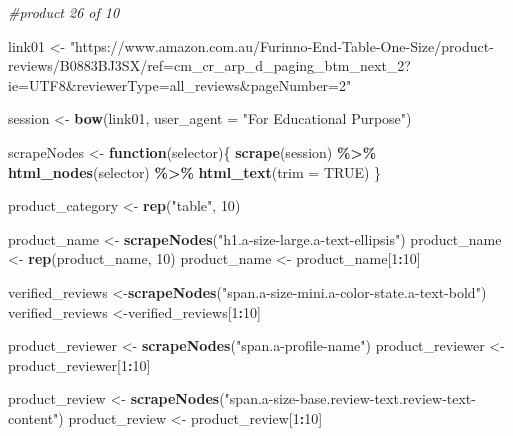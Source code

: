 \documentclass[
]{article}
\newenvironment{Shaded}{\begin{snugshade}}{\end{snugshade}}
\newcommand{\AttributeTok}[1]{\textcolor[rgb]{0.13,0.29,0.53}{#1}}
\newcommand{\CommentTok}[1]{\textcolor[rgb]{0.56,0.35,0.01}{\textit{#1}}}
\newcommand{\ConstantTok}[1]{\textcolor[rgb]{0.56,0.35,0.01}{#1}}
\newcommand{\ControlFlowTok}[1]{\textcolor[rgb]{0.13,0.29,0.53}{\textbf{#1}}}
\newcommand{\DecValTok}[1]{\textcolor[rgb]{0.00,0.00,0.81}{#1}}
\newcommand{\FunctionTok}[1]{\textcolor[rgb]{0.13,0.29,0.53}{\textbf{#1}}}
\newcommand{\NormalTok}[1]{#1}
\newcommand{\OtherTok}[1]{\textcolor[rgb]{0.56,0.35,0.01}{#1}}
\newcommand{\SpecialCharTok}[1]{\textcolor[rgb]{0.81,0.36,0.00}{\textbf{#1}}}
\newcommand{\StringTok}[1]{\textcolor[rgb]{0.31,0.60,0.02}{#1}}
\begin{document}
\begin{Shaded}
\begin{Highlighting}[]
\CommentTok{\#product 26 of 10}

\NormalTok{link01 }\OtherTok{\textless{}{-}} \StringTok{"https://www.amazon.com.au/Furinno{-}End{-}Table{-}One{-}Size/product{-}reviews/B0883BJ3SX/ref=cm\_cr\_arp\_d\_paging\_btm\_next\_2?ie=UTF8\&reviewerType=all\_reviews\&pageNumber=2"}


\NormalTok{  session }\OtherTok{\textless{}{-}} \FunctionTok{bow}\NormalTok{(link01,}
               \AttributeTok{user\_agent =} \StringTok{"For Educational Purpose"}\NormalTok{)}

\NormalTok{  scrapeNodes }\OtherTok{\textless{}{-}} \ControlFlowTok{function}\NormalTok{(selector)\{}
    \FunctionTok{scrape}\NormalTok{(session) }\SpecialCharTok{\%\textgreater{}\%}
      \FunctionTok{html\_nodes}\NormalTok{(selector) }\SpecialCharTok{\%\textgreater{}\%}
      \FunctionTok{html\_text}\NormalTok{(}\AttributeTok{trim =} \ConstantTok{TRUE}\NormalTok{)}
\NormalTok{  \}}

\NormalTok{  product\_category }\OtherTok{\textless{}{-}} \FunctionTok{rep}\NormalTok{(}\StringTok{"table"}\NormalTok{, }\DecValTok{10}\NormalTok{)}

\NormalTok{  product\_name }\OtherTok{\textless{}{-}} \FunctionTok{scrapeNodes}\NormalTok{(}\StringTok{"h1.a{-}size{-}large.a{-}text{-}ellipsis"}\NormalTok{)}
\NormalTok{  product\_name }\OtherTok{\textless{}{-}} \FunctionTok{rep}\NormalTok{(product\_name, }\DecValTok{10}\NormalTok{)}
\NormalTok{  product\_name }\OtherTok{\textless{}{-}}\NormalTok{ product\_name[}\DecValTok{1}\SpecialCharTok{:}\DecValTok{10}\NormalTok{]}
  
\NormalTok{  verified\_reviews }\OtherTok{\textless{}{-}}\FunctionTok{scrapeNodes}\NormalTok{(}\StringTok{"span.a{-}size{-}mini.a{-}color{-}state.a{-}text{-}bold"}\NormalTok{)}
\NormalTok{  verified\_reviews }\OtherTok{\textless{}{-}}\NormalTok{verified\_reviews[}\DecValTok{1}\SpecialCharTok{:}\DecValTok{10}\NormalTok{]}
  
\NormalTok{  product\_reviewer }\OtherTok{\textless{}{-}} \FunctionTok{scrapeNodes}\NormalTok{(}\StringTok{"span.a{-}profile{-}name"}\NormalTok{)}
\NormalTok{  product\_reviewer }\OtherTok{\textless{}{-}}\NormalTok{ product\_reviewer[}\DecValTok{1}\SpecialCharTok{:}\DecValTok{10}\NormalTok{]}
  
\NormalTok{  product\_review }\OtherTok{\textless{}{-}} \FunctionTok{scrapeNodes}\NormalTok{(}\StringTok{"span.a{-}size{-}base.review{-}text.review{-}text{-}content"}\NormalTok{)}
\NormalTok{  product\_review }\OtherTok{\textless{}{-}}\NormalTok{ product\_review[}\DecValTok{1}\SpecialCharTok{:}\DecValTok{10}\NormalTok{]}
  

\end{Highlighting}
\end{Shaded}
\end{document}
